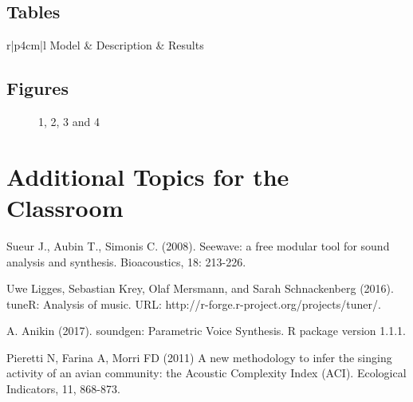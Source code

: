 \subsection{Tables}

\centering	
\begin{table}[H]\tiny
	\caption{}	
	\begin{tabular}{r|p{4cm}|l}
		\hline	
		Model & Description & Results \\
		\hline 
		\hline 
	\end{tabular}
\end{table}

\subsection{Figures}

\begin{figure}[H]
	\centering
	\begin{minipage}[b]{0.5\linewidth}
	\end{minipage}\hfill
	\begin{minipage}[b]{0.5\linewidth}
	\end{minipage}\hfill	
	\begin{minipage}[b]{0.5\linewidth}
	\end{minipage}\hfill
	\begin{minipage}[b]{0.5\linewidth}
	\end{minipage}\hfill
	\caption{1, 2, 3 and 4}
	\label{fig:Figure1}
\end{figure} 


\section{Additional Topics for the Classroom}

\begin{enumerate}
\end{enumerate}


\begin{thebibliography}{00}
Sueur J., Aubin T., Simonis C. (2008). 
\newblock Seewave: a free modular tool for sound analysis and synthesis. 
\newblock Bioacoustics, 18: 213-226.

Uwe Ligges, Sebastian Krey, Olaf Mersmann, and Sarah Schnackenberg (2016). 
\newblock tuneR: Analysis of music. 
\newblock URL: http://r-forge.r-project.org/projects/tuner/.

A. Anikin (2017). 
\newblock soundgen: Parametric Voice Synthesis. 
\newblock R package version 1.1.1.

Pieretti N, Farina A, Morri FD (2011) 
\newblock A new methodology to infer the singing activity of an avian community: the Acoustic Complexity Index (ACI). 
\newblock Ecological Indicators, 11, 868-873.
\end{thebibliography}


